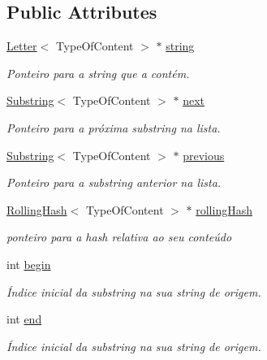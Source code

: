 \subsection*{Public Attributes}
\begin{DoxyCompactItemize}
\item 
\hyperlink{classLetter}{Letter}$<$ Type\+Of\+Content $>$ $\ast$ \hyperlink{classSubstring_a8d1fd97efa348288f4b39bea36a8e879}{string}
\begin{DoxyCompactList}\small\item\em Ponteiro para a string que a contém. \end{DoxyCompactList}\item 
\hyperlink{classSubstring}{Substring}$<$ Type\+Of\+Content $>$ $\ast$ \hyperlink{classSubstring_a5965b296a10e4a5fd874913f07754451}{next}
\begin{DoxyCompactList}\small\item\em Ponteiro para a próxima substring na lista. \end{DoxyCompactList}\item 
\hyperlink{classSubstring}{Substring}$<$ Type\+Of\+Content $>$ $\ast$ \hyperlink{classSubstring_a992d0f85409426c420d243ac18d2bca5}{previous}
\begin{DoxyCompactList}\small\item\em Ponteiro para a substring anterior na lista. \end{DoxyCompactList}\item 
\hyperlink{classRollingHash}{Rolling\+Hash}$<$ Type\+Of\+Content $>$ $\ast$ \hyperlink{classSubstring_a84e0e55a0ecbd5f74d25441df0edc68e}{rolling\+Hash}
\begin{DoxyCompactList}\small\item\em ponteiro para a hash relativa ao seu conteúdo \end{DoxyCompactList}\item 
int \hyperlink{classSubstring_a88e2864cc7847c7f57815de891246cfe}{begin}
\begin{DoxyCompactList}\small\item\em Índice inicial da substring na sua string de origem. \end{DoxyCompactList}\item 
int \hyperlink{classSubstring_a5a223bd1f3483d1ee55f4b3997a48862}{end}
\begin{DoxyCompactList}\small\item\em Índice inicial da substring na sua string de origem. \end{DoxyCompactList}\end{DoxyCompactItemize}


